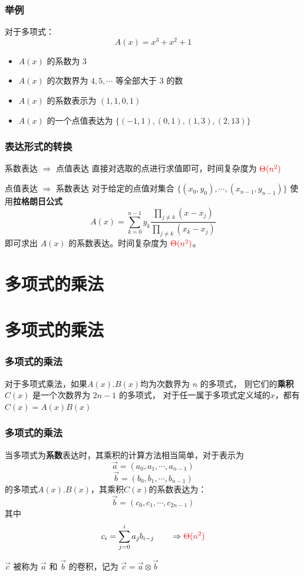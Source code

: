 \documentclass[UTF8]{ctexbeamer}
\begin{document}
\begin{frame}
    \frametitle{举例}
    对于多项式：
    $$ A(x) = x^3 + x^2 + 1 $$

    \begin{itemize}
        \item $A(x)$ 的系数为 $3$
        \item $A(x)$ 的次数界为 $4, 5, \cdots$ 等全部大于 $3$ 的数
        \item $A(x)$ 的系数表示为 $ (1, 1, 0, 1)$
        \item $A(x)$ 的一个点值表达为 $\{ (-1, 1), (0, 1), (1, 3), (2, 13) \}$
    \end{itemize}
\end{frame}

\begin{frame}
    \frametitle{表达形式的转换}
    \begin{block}{系数表达 $\Rightarrow$ 点值表达}
        直接对选取的点进行求值即可，时间复杂度为 $\textcolor{red}{\Theta(n^2)}$
    \end{block}
    \begin{block}{点值表达 $\Rightarrow$ 系数表达}
        对于给定的点值对集合 $\{ (x_0, y_0), \cdots, (x_{n-1}, y_{n-1})\}$
        使用\textbf{拉格朗日公式}
        $$A(x) = \sum_{k = 0}^{n - 1} y_k \frac{\prod_{j \neq k}(x - x_j)}{\prod_{j \neq k}(x_k - x_j)}$$
        即可求出 $A(x)$ 的系数表达。时间复杂度为 $\textcolor{red}{\Theta(n^2)}$。
    \end{block}
\end{frame}

\section{多项式的乘法}

\section{多项式的乘法}

\begin{frame}
    \frametitle{多项式的乘法}
    对于多项式乘法，如果$A(x). B(x)$均为次数界为 $n$ 的多项式，
    则它们的\textbf{乘积} $C(x)$ 是一个次数界为 $2n - 1$ 的多项式，
    对于任一属于多项式定义域的$x$，都有$C(x) = A(x)B(x)$
\end{frame}

\begin{frame}
    \frametitle{多项式的乘法}
    当多项式为\textbf{系数}表达时，其乘积的计算方法相当简单，对于表示为
    $$\vec{a} = (a_0, a_1, \cdots, a_{n-1})$$
    $$\vec{b} = (b_0, b_1, \cdots, b_{n-1})$$
    的多项式$A(x). B(x)$，其乘积$C(x)$的系数表达为：
    $$\vec{b} = (c_0, c_1, \cdots, c_{2n-1})$$
    其中
    $$c_i = \sum_{j = 0}^{i} a_j b_{i - j} \qquad \Rightarrow \textcolor{red}{\Theta(n^2)}$$
    \begin{block}{}
        $\vec{c}$ 被称为 $\vec{a}$ 和 $\vec{b}$ 的卷积，记为
        $\vec{c} = \vec{a} \otimes \vec{b}$
    \end{block}
\end{frame}
\end{document}
